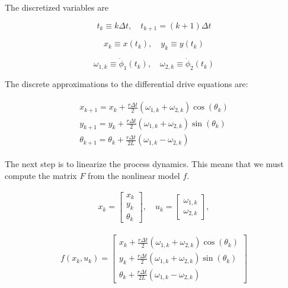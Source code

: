 The discretized variables are

\[t_k \equiv k\Delta t, \quad t_{k+1} = (k+1)\Delta t\]

\[x_k \equiv x(t_k), \quad y_k \equiv y(t_k)\]

\[\omega_{1, k}\equiv \dot{\phi}_{1}(t_k),  \quad
\omega_{2, k}\equiv \dot{\phi}_{2}(t_k)\]

The discrete approximations to the differential drive equations are:

\[\begin{aligned}
\begin{array}{l}
\displaystyle x_{k+1} = x_k + \frac{r\Delta t}{2} (\omega_{1, k}+\omega_{2, k})\cos(\theta_k) \\[2mm]
\displaystyle y_{k+1} = y_k + \frac{r\Delta t}{2} (\omega_{1, k}+\omega_{2, k})\sin(\theta_k) \\[2mm]
\displaystyle \theta_{k+1} = \theta_k + \frac{r\Delta t}{2L} (\omega_{1, k}-\omega_{2, k})
\end{array}
\end{aligned}\]

The next step is to linearize the process dynamics. This means that we
must compute the matrix \(F\) from the nonlinear model \(f\).

\[\begin{aligned}
x_k = \begin{bmatrix} x_k \\ y_k \\ \theta_k \end{bmatrix}, \quad
u_k = \begin{bmatrix} \omega_{1, k} \\ \omega_{2, k}\end{bmatrix},
\end{aligned}\]

\[\begin{aligned}
f(x_k,u_k) = \begin{bmatrix}
               x_k + \frac{r\Delta t}{2} (\omega_{1, k}+\omega_{2, k})\cos(\theta_k) \\[3mm]
y_k + \frac{r\Delta t}{2} (\omega_{1, k}+\omega_{2, k})\sin(\theta_k) \\[3mm]
\theta_k + \frac{r\Delta t}{2L} (\omega_{1, k}-\omega_{2, k})
             \end{bmatrix}
\end{aligned}\]

